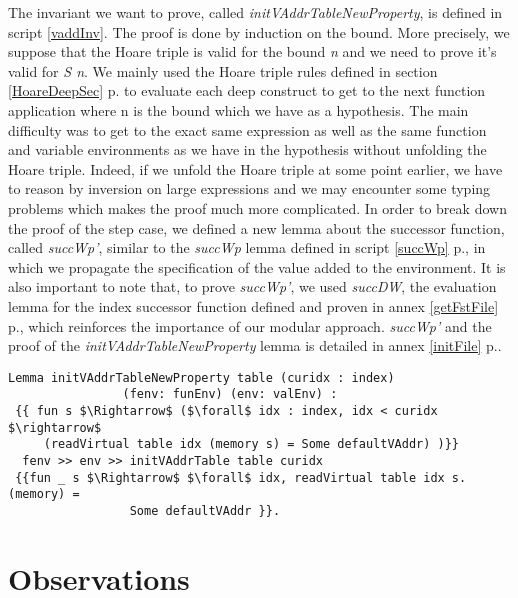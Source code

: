 The invariant we want to prove, called \textit{initVAddrTableNewProperty}, is defined in script \ref{vaddInv}. The proof is done by induction on the bound. More precisely, we suppose that the Hoare triple is valid for the bound \textit{n} and we need to prove it's valid for \textit{S n}. We mainly used the Hoare triple rules defined in section \ref{HoareDeepSec} p.\pageref{HoareDeepSec} to evaluate each deep construct to get to the next function application where n is the bound which we have as a hypothesis. The main difficulty was to get to the exact same expression as well as the same function and variable environments as we have in the hypothesis without unfolding the Hoare triple. Indeed, if we unfold the Hoare triple at some point earlier, we have to reason by inversion on large expressions and we may encounter some typing problems which makes the proof much more complicated. In order to break down the proof of the step case, we defined a new lemma about the successor function, called \textit{succWp'}, similar to the \textit{succWp} lemma defined in script \ref{succWp} p.\pageref{succWp}, in which we propagate the specification of the value added to the environment.  It is also important to note that, to prove \textit{succWp'}, we used \textit{succDW}, the evaluation lemma for the index successor function defined and proven in annex \ref{getFstFile} p.\pageref{getFstFile}, which reinforces the importance of our modular approach. \textit{succWp'} and the proof of the \textit{initVAddrTableNewProperty} lemma is detailed in annex \ref{initFile} p.\pageref{initFile}.
\begin{lstlisting}[caption = {initVAddrTableNewProperty invariant in the deep embedding}, xleftmargin=-.07\textwidth,
xrightmargin=-.07\textwidth,mathescape=true, label={vaddInv}]
Lemma initVAddrTableNewProperty table (curidx : index) 
                (fenv: funEnv) (env: valEnv) :
 {{ fun s $\Rightarrow$ ($\forall$ idx : index, idx < curidx $\rightarrow$ 
     (readVirtual table idx (memory s) = Some defaultVAddr) )}} 
  fenv >> env >> initVAddrTable table curidx 
 {{fun _ s $\Rightarrow$ $\forall$ idx, readVirtual table idx s.(memory) = 
 	             Some defaultVAddr }}. 
\end{lstlisting}	


\section{Observations}

